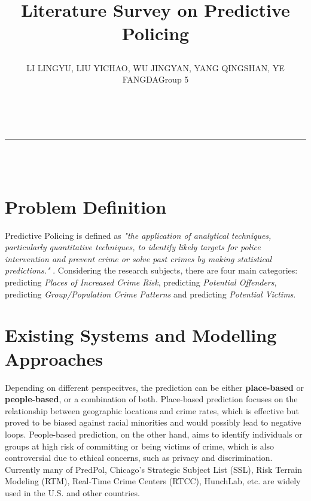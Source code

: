 \documentclass[11pt]{article}
\title{\raggedright Literature Survey on Predictive Policing}
\author{\raggedright \small{LI LINGYU, LIU YICHAO, WU JINGYAN, YANG QINGSHAN, YE FANGDA}\hfill \small{Group 5}}
\date{}
\begin{document}
\makeatletter
\begin{flushleft}
    {\LARGE \@title} \\[-0.5em] %
    \rule{\textwidth}{1pt} \\[0em] %
    {\large \@author} \\[0em] %
\end{flushleft}
\makeatother
\section{Problem Definition}
Predictive Policing is defined as \textit{"the application of analytical techniques, particularly quantitative techniques, to identify likely targets for police intervention and prevent crime or solve past crimes by making statistical predictions."} \cite{RAND2013}. Considering the research subjects, there are four main categories: predicting \textit{Places of Increased Crime Risk}, predicting \textit{Potential Offenders}, predicting \textit{Group/Population Crime Patterns} and predicting \textit{Potential Victims}. 


\section{Existing Systems and Modelling Approaches}
Depending on different perspecitves, the prediction can be either \textbf{place-based} or \textbf{people-based}, or a combination of both. Place-based prediction focuses on the relationship between geographic locations and crime rates, which is effective but proved to be biased against racial minorities and would possibly lead to negative loops\cite{brantingham2018biased}. People-based prediction, on the other hand, aims to identify individuals or groups at high risk of committing or being victims of crime, which is also controversial due to ethical concerns, such as privacy and discrimination. Currently many of  PredPol\cite{ferguson2017rise,ensign2017runaway}, Chicago's Strategic Subject List (SSL)\cite{tayebi2016social}, Risk Terrain Modeling (RTM)\cite{caplan2011risk}, Real-Time Crime Centers (RTCC)\cite{ratcliffe2011philadelphia}, HunchLab\cite{hunchlab_ratcliffe_philadelphia_2019}, etc. are widely used in the U.S. and other countries.
\end{document}

